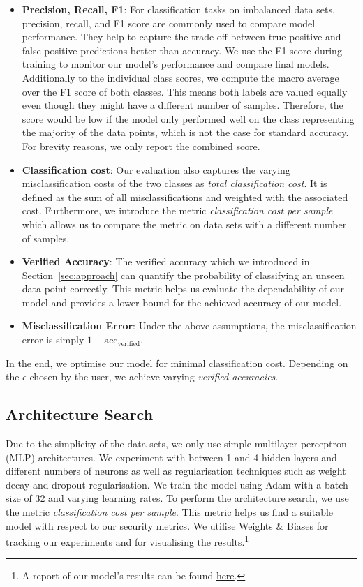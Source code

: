 \documentclass[acmsmall,nonacm]{acmart}
\begin{document}
\begin{itemize}
	\item \textbf{Precision, Recall, F1}: For classification tasks on imbalanced data sets, precision, recall, and F1 score are commonly used to compare model performance. They help to capture the trade-off between true-positive and false-positive predictions better than accuracy. We use the F1 score during training to monitor our model's performance and compare final models. Additionally to the individual class scores, we compute the macro average over the F1 score of both classes. This means both labels are valued equally even though they might have a different number of samples. Therefore, the score would be low if the model only performed well on the class representing the majority of the data points, which is not the case for standard accuracy. For brevity reasons, we only report the combined score.
	\item \textbf{Classification cost}: Our evaluation also captures the varying misclassification costs of the two classes as \textit{total classification cost}. It is defined as the sum of all misclassifications and weighted with the associated cost. Furthermore, we introduce the metric \textit{classification cost per sample} which allows us to compare the metric on data sets with a different number of samples. 
	\item \textbf{Verified Accuracy}: The verified accuracy which we introduced in Section~\ref{sec:approach} can quantify the probability of classifying an unseen data point correctly. This metric helps us evaluate the dependability of our model and provides a lower bound for the achieved accuracy of our model. 
	\item \textbf{Misclassification Error}: Under the above assumptions, the misclassification error is simply $1 - \text{acc}_\text{verified}$.
\end{itemize}

In the end, we optimise our model for minimal classification cost. Depending on the $\epsilon$ chosen by the user, we achieve varying \textit{verified accuracies}.

\subsection{Architecture Search}
Due to the simplicity of the data sets, we only use simple multilayer perceptron (MLP) architectures. We experiment with between 1 and 4 hidden layers and different numbers of neurons as well as regularisation techniques such as weight decay and dropout regularisation. We train the model using Adam with a batch size of 32 and varying learning rates. To perform the architecture search, we use the metric \textit{classification cost per sample}. This metric helps us find a suitable model with respect to our security metrics. We utilise Weights \& Biases \cite{wandb} for tracking our experiments and for visualising the results.\footnote{A report of our model's results can be found \href{https://wandb.ai/implication-elimination/dependable-classification/reports/Siemens-AI-Dependability-Assessment-Results--Vmlldzo2NTQ4Mjc?accessToken=r8qsleb47wg3u5sn41lh88rtdm81ryukk6t45jch44sjpc715mdxkd1nz7zd4htv}{\underline{here}}. }
\end{document}
